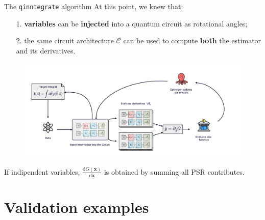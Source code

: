\documentclass[8pt, xcolor={svgnames}, hyperref={linkcolor=black}]{beamer}
\begin{document}
\begin{frame}{The \texttt{qinntegrate} algorithm}
At this point, we knew that:
\pause
\begin{itemize}[noitemsep]
\item[1.] \textbf{variables} can be \textbf{injected} into a quantum circuit as rotational angles;
\pause
\item[2.] the same circuit architecture $\mathcal{C}$ can be used to compute \textbf{both} the estimator 
and its derivatives.
\pause
\vspace{-0.4cm}
\end{itemize}
\begin{figure}  
    \includegraphics[width=1\textwidth]{figures/qinntegrate.pdf}
\end{figure}
If indipendent variables, $\frac{\text{d}G(\bm{x})}{\text{d}\bm{x}}$ 
is obtained by summing all PSR contributes.
\end{frame}

\section{Validation examples}
\end{document}
